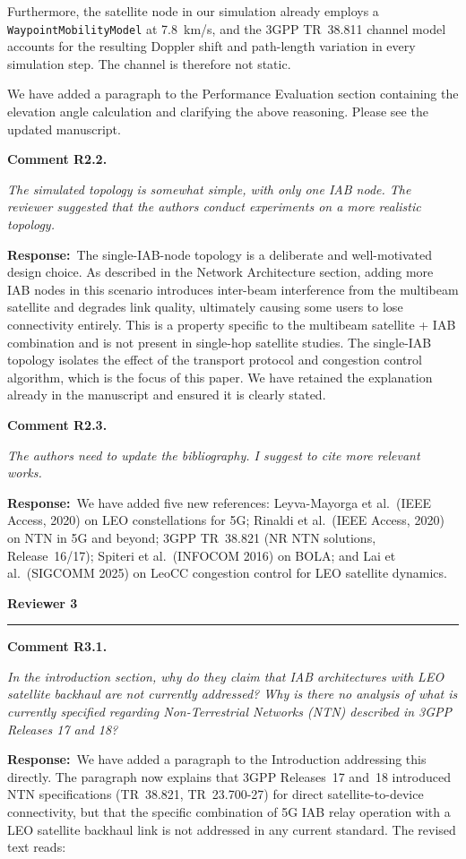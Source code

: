 \documentclass[11pt]{article}
\newcommand{\reviewer}[1]{\vspace{1em}\noindent\textbf{\large #1}\vspace{0.4em}\hrule\vspace{0.6em}}
\newcommand{\comment}[2]{\vspace{0.8em}\noindent\textbf{Comment #1.}\begin{reviewbox}\textit{#2}\end{reviewbox}}
\newcommand{\response}{\noindent\textbf{Response:}~}
\begin{document}
Furthermore, the satellite node in our simulation already employs a \texttt{WaypointMobilityModel} at 7.8~km/s, and the 3GPP TR~38.811 channel model accounts for the resulting Doppler shift and path-length variation in every simulation step. The channel is therefore not static.

We have added a paragraph to the Performance Evaluation section containing the elevation angle calculation and clarifying the above reasoning. Please see the updated manuscript.

\comment{R2.2}{The simulated topology is somewhat simple, with only one IAB node. The reviewer suggested that the authors conduct experiments on a more realistic topology.}

\response The single-IAB-node topology is a deliberate and well-motivated design choice. As described in the Network Architecture section, adding more IAB nodes in this scenario introduces inter-beam interference from the multibeam satellite and degrades link quality, ultimately causing some users to lose connectivity entirely. This is a property specific to the multibeam satellite + IAB combination and is not present in single-hop satellite studies. The single-IAB topology isolates the effect of the transport protocol and congestion control algorithm, which is the focus of this paper. We have retained the explanation already in the manuscript and ensured it is clearly stated.

\comment{R2.3}{The authors need to update the bibliography. I suggest to cite more relevant works.}

\response We have added five new references: Leyva-Mayorga et al.\ (IEEE Access, 2020) on LEO constellations for 5G; Rinaldi et al.\ (IEEE Access, 2020) on NTN in 5G and beyond; 3GPP TR~38.821 (NR NTN solutions, Release~16/17); Spiteri et al.\ (INFOCOM 2016) on BOLA; and Lai et al.\ (SIGCOMM 2025) on LeoCC congestion control for LEO satellite dynamics.

\reviewer{Reviewer 3}

\comment{R3.1}{In the introduction section, why do they claim that IAB architectures with LEO satellite backhaul are not currently addressed? Why is there no analysis of what is currently specified regarding Non-Terrestrial Networks (NTN) described in 3GPP Releases 17 and 18?}

\response We have added a paragraph to the Introduction addressing this directly. The paragraph now explains that 3GPP Releases~17 and~18 introduced NTN specifications (TR~38.821, TR~23.700-27) for direct satellite-to-device connectivity, but that the specific combination of 5G IAB relay operation with a LEO satellite backhaul link is not addressed in any current standard. The revised text reads:
\end{document}
